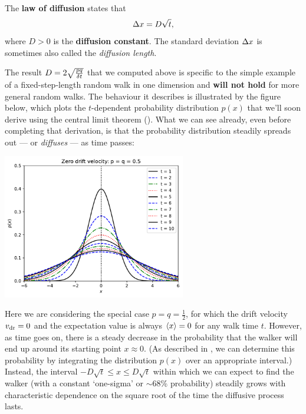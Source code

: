 \begin{shaded}
  The \textbf{law of diffusion} states that
  \begin{equation}
    \label{eq:diff_law}
    \Delta x = D \sqrt{t},
  \end{equation}
  where $D > 0$ is the \textbf{diffusion constant}.
  The standard deviation $\Delta x$ is sometimes also called the \textit{diffusion length}.
\end{shaded}

The result $D = 2\sqrt{\frac{pq}{\delta t}}$ that we computed above is specific to the simple example of a fixed-step-length random walk in one dimension and \textbf{will not hold} for more general random walks.
The behaviour it describes is illustrated by the figure below, which plots the $t$-dependent probability distribution $p(x)$ that we'll soon derive using the central limit theorem ().
What we can see already, even before completing that derivation, is that the probability distribution steadily spreads out --- or \textit{diffuses} --- as time passes:
\begin{center}
  \includegraphics[width=0.6\textwidth]{figs/unit01_diff_zero.pdf} %
\end{center}
Here we are considering the special case $p = q = \frac{1}{2}$, for which the drift velocity $v_{\mathrm{dr}} = 0$ and the expectation value is always $\left\langle x \right\rangle = 0$ for any walk time $t$.
However, as time goes on, there is a steady decrease in the probability that the walker will end up around its starting point $x \approx 0$.
(As described in , we can determine this probability by integrating the distribution $p(x)$ over an appropriate interval.)
Instead, the interval $-D\sqrt{t} \leq x \leq D\sqrt{t}$ within which we can expect to find the walker (with a constant `one-sigma' or $\sim$68\% probability) steadily grows with characteristic dependence on the square root of the time the diffusive process lasts.

